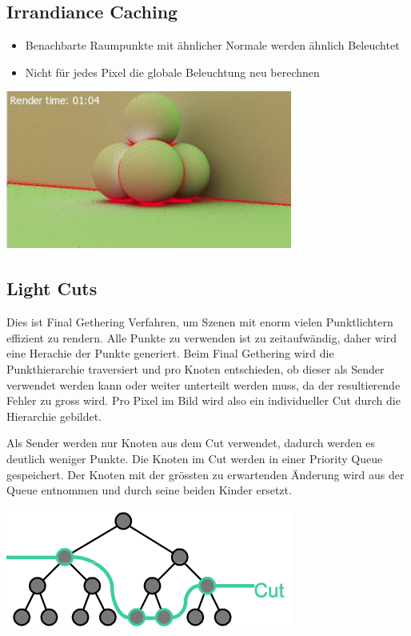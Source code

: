 \documentclass[10pt]{article}
\begin{document}
\subsection{Irrandiance Caching}
\begin{itemize}
	\item Benachbarte Raumpunkte mit ähnlicher Normale werden ähnlich Beleuchtet
	\item Nicht für jedes Pixel die globale Beleuchtung neu berechnen
\end{itemize}
\begin{center}
	\includegraphics[scale=0.3]{IrrandianceCaching.png}
\end{center}

\subsection{Light Cuts}
Dies ist Final Gethering Verfahren, um Szenen mit enorm vielen Punktlichtern effizient zu rendern. Alle Punkte zu verwenden ist zu zeitaufwändig, daher wird eine Herachie der Punkte generiert. Beim Final Gethering wird die Punkthierarchie traversiert und pro Knoten entschieden, ob dieser als Sender verwendet werden kann oder weiter unterteilt werden muss, da der resultierende Fehler zu gross wird. Pro Pixel im Bild wird also ein individueller Cut durch die Hierarchie gebildet.

Als Sender werden nur Knoten aus dem Cut verwendet, dadurch werden es deutlich weniger Punkte. Die Knoten im Cut werden in einer Priority Queue gespeichert. Der Knoten mit der grössten zu erwartenden Änderung wird aus der Queue entnommen und durch seine beiden Kinder ersetzt.
\begin{center}
	\includegraphics[scale=0.3]{lightcut.png}
\end{center}
\end{document}
